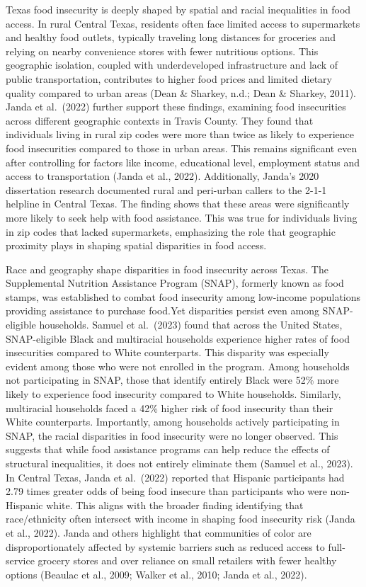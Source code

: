 \documentclass[]{article}
\begin{document}
Texas food insecurity is deeply shaped by spatial and racial
inequalities in food access. In rural Central Texas, residents often
face limited access to supermarkets and healthy food outlets, typically
traveling long distances for groceries and relying on nearby convenience
stores with fewer nutritious options. This geographic isolation, coupled
with underdeveloped infrastructure and lack of public transportation,
contributes to higher food prices and limited dietary quality compared
to urban areas (Dean \& Sharkey, n.d.; Dean \& Sharkey, 2011). Janda et
al.~(2022) further support these findings, examining food insecurities
across different geographic contexts in Travis County. They found that
individuals living in rural zip codes were more than twice as likely to
experience food insecurities compared to those in urban areas. This
remains significant even after controlling for factors like income,
educational level, employment status and access to transportation (Janda
et al., 2022). Additionally, Janda's 2020 dissertation research
documented rural and peri-urban callers to the 2-1-1 helpline in Central
Texas. The finding shows that these areas were significantly more likely
to seek help with food assistance. This was true for individuals living
in zip codes that lacked supermarkets, emphasizing the role that
geographic proximity plays in shaping spatial disparities in food
access.

Race and geography shape disparities in food insecurity across Texas.
The Supplemental Nutrition Assistance Program (SNAP), formerly known as
food stamps, was established to combat food insecurity among low-income
populations providing assistance to purchase food.Yet disparities
persist even among SNAP-eligible households. Samuel et al.~(2023) found
that across the United States, SNAP-eligible Black and multiracial
households experience higher rates of food insecurities compared to
White counterparts. This disparity was especially evident among those
who were not enrolled in the program. Among households not participating
in SNAP, those that identify entirely Black were 52\% more likely to
experience food insecurity compared to White households. Similarly,
multiracial households faced a 42\% higher risk of food insecurity than
their White counterparts. Importantly, among households actively
participating in SNAP, the racial disparities in food insecurity were no
longer observed. This suggests that while food assistance programs can
help reduce the effects of structural inequalities, it does not entirely
eliminate them (Samuel et al., 2023). In Central Texas, Janda et
al.~(2022) reported that Hispanic participants had 2.79 times greater
odds of being food insecure than participants who were non-Hispanic
white. This aligns with the broader finding identifying that
race/ethnicity often intersect with income in shaping food insecurity
risk (Janda et al., 2022). Janda and others highlight that communities
of color are disproportionately affected by systemic barriers such as
reduced access to full-service grocery stores and over reliance on small
retailers with fewer healthy options (Beaulac et al., 2009; Walker et
al., 2010; Janda et al., 2022).
\end{document}
